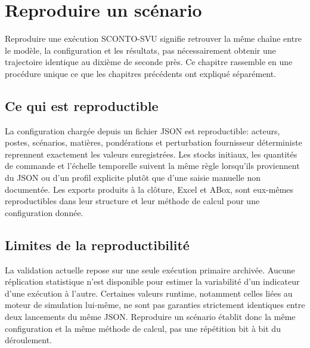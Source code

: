 \chapter{Reproduire un scénario}
\label{chap:reproduire-scenario}

Reproduire une exécution SCONTO-SVU signifie retrouver la même chaîne entre le modèle, la configuration et les résultats, pas nécessairement obtenir une trajectoire identique au dixième de seconde près. Ce chapitre rassemble en une procédure unique ce que les chapitres précédents ont expliqué séparément.


\section{Ce qui est reproductible}

La configuration chargée depuis un fichier JSON est reproductible: acteurs, postes, scénarios, matières, pondérations et perturbation fournisseur déterministe reprennent exactement les valeurs enregistrées. Les stocks initiaux, les quantités de commande et l'échelle temporelle suivent la même règle lorsqu'ils proviennent du JSON ou d'un profil explicite plutôt que d'une saisie manuelle non documentée. Les exports produits à la clôture, Excel et ABox, sont eux-mêmes reproductibles dans leur structure et leur méthode de calcul pour une configuration donnée.

\section{Limites de la reproductibilité}


La validation actuelle repose sur une seule exécution primaire archivée. Aucune réplication statistique n'est disponible pour estimer la variabilité d'un indicateur d'une exécution à l'autre. Certaines valeurs runtime, notamment celles liées au moteur de simulation lui-même, ne sont pas garanties strictement identiques entre deux lancements du même JSON. Reproduire un scénario établit donc la même configuration et la même méthode de calcul, pas une répétition bit à bit du déroulement.

